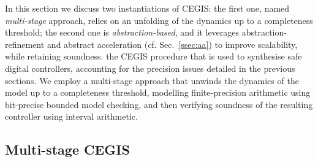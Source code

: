 \documentclass[twocolumn]{autart}    %
\begin{document}
In this section we discuss 
\ifx\axelerator
two instantiations of CEGIS: 
the first one,
named {\it multi-stage} approach, 
relies on an unfolding of the dynamics up to a completeness threshold; 
the second one is {\it abstraction-based}, 
and it leverages abstraction-refinement \cite{DBLP:conf/cav/ClarkeGJLV00} and abstract acceleration (cf. Sec.~\ref{ssec:aa}) to improve scalability,  
while retaining soundness. 
\else
the CEGIS procedure that is used to synthesise safe digital controllers, 
accounting for the precision issues detailed in the previous sections. 
We employ a multi-stage approach that unwinds the dynamics of the model up to a completeness threshold, 
modelling finite-precision arithmetic using bit-precise bounded model checking, 
and then verifying soundness of the resulting controller using interval arithmetic. 
\fi

\ifx\axelerator
\subsection{Multi-stage CEGIS} 
\label{sssec:naive}
\fi
\end{document}
